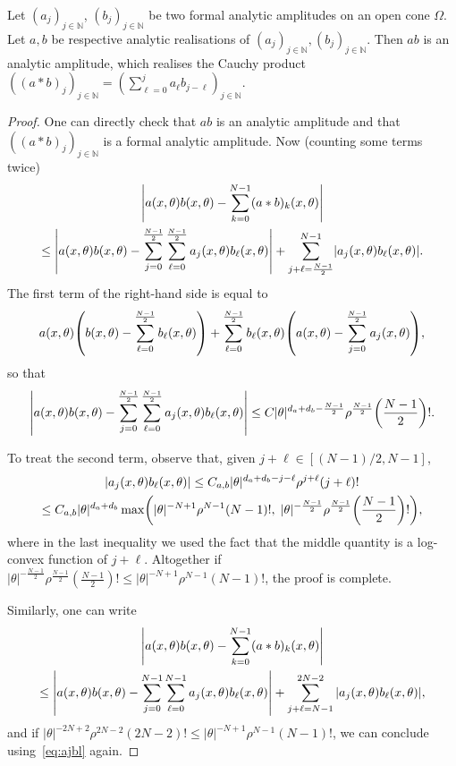 \documentclass[10pt]{amsart}
\theoremstyle{definition}\newtheorem{defi}[theo]{Definition}\newtheorem{rema}[theo]{Remark}\newtheorem{exam}[theo]{Example}\newtheorem{exem}[theo]{Example}\newtheorem{nota}[theo]{Notation}
\newcommand\1{\mathds{1}}
\newcommand{\N}{\mathbb{N}}
\let\originalleft\left
\let\originalright\right
\renewcommand{\left}{\mathopen{}\mathclose\bgroup\originalleft}
\renewcommand{\right}{\aftergroup\egroup\originalright}
\begin{document}
\begin{prop}\label{prop:Cauchy_product}
Let $(a_j)_{j\in \N}$, $(b_j)_{j\in \N}$ be two formal analytic amplitudes on an open cone $\Omega$. Let $a,b$ be respective analytic realisations of $(a_j)_{j\in \N},(b_j)_{j\in \N}$. Then $ab$ is an analytic amplitude, which realises the Cauchy product $((a*b)_j)_{j\in \N}=(\sum_{\ell=0}^ja_{\ell}b_{j-\ell})_{j\in \N}$.
\end{prop}
\begin{proof}
One can directly check that $ab$ is an analytic amplitude and that\linebreak $((a*b)_j)_{j\in \N}$ is a formal analytic amplitude. Now (counting some terms twice)
\begin{multline*}
\left|a(x,\theta)b(x,\theta)-\sum_{k=0}^{N-1}(a*b)_k(x,\theta)\right|\\ \leq
\left|a(x,\theta)b(x,\theta)-\sum_{j=0}^{\frac{N-1}{2}}\sum_{\ell=0}^{\frac{N-1}{2}}a_j(x,\theta)b_\ell(x,\theta)\right|+\sum_{j+\ell=\frac{N-1}{2}}^{N-1}
\left|a_j(x,\theta)b_{\ell}(x,\theta)\right|.
\end{multline*}
The first term of the right-hand side is equal to
\[
a(x,\theta)\left(b(x,\theta)-\sum_{\ell=0}^{\frac{N-1}{2}}b_\ell(x,\theta)\right)+\sum_{\ell=0}^{\frac{N-1}{2}}b_{\ell}(x,\theta)\left(a(x,\theta)-\sum_{j=0}^{\frac{N-1}{2}}a_j(x,\theta)\right),
\]
so that
\[
\left|a(x,\theta)b(x,\theta)-\sum_{j=0}^{\frac{N-1}{2}}\sum_{\ell=0}^{\frac{N-1}{2}}a_j(x,\theta)b_\ell(x,\theta)\right|\leq C|\theta|^{d_a+d_b-\frac{N-1}{2}}\rho^{\frac{N-1}{2}}\left(\frac{N-1}{2}\right)!.
\]

To treat the second term, observe that, given $j+\ell\in [(N-1)/2,N-1]$,
\begin{multline}\label{eq:ajbl}
|a_j(x,\theta)b_{\ell}(x,\theta)|\leq C_{a,b}|\theta|^{d_a+d_b-j-\ell}\rho^{j+\ell}(j+\ell)!\\ \leq C_{a,b}|\theta|^{d_a+d_b}\max\left(|\theta|^{-N+1}\rho^{N-1}(N-1)!,\;|\theta|^{-\frac{N-1}{2}}\rho^{\frac{N-1}{2}}\left(\frac{N-1}{2}\right)!\right),
\end{multline}
where in the last inequality we used the fact that the middle quantity is a log-convex function of $j+\ell$. Altogether if $|\theta|^{-\frac{N-1}{2}}\rho^{\frac{N-1}{2}}(\frac{N-1}{2})!\leq |\theta|^{-N+1}\rho^{N-1}(N-1)!$, the proof is complete.

Similarly, one can write
\begin{multline*}
\left|a(x,\theta)b(x,\theta)-\sum_{k=0}^{N-1}(a*b)_k(x,\theta)\right|\\ \leq
\left|a(x,\theta)b(x,\theta)-\sum_{j=0}^{N-1}\sum_{\ell=0}^{N-1}a_j(x,\theta)b_\ell(x,\theta)\right|+\sum_{j+\ell=N-1}^{2N-2}|a_j(x,\theta)b_{\ell}(x,\theta)|,
\end{multline*}
and if $|\theta|^{-2N+2}\rho^{2N-2}(2N-2)!\leq |\theta|^{-N+1}\rho^{N-1}(N-1)!$, we can conclude using~\eqref{eq:ajbl} again.


\end{proof}
\end{document}
